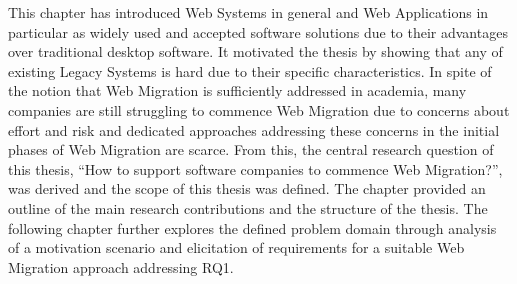 This chapter has introduced \glspl{Web System} in general and \glspl{Web Application} in particular as widely used and accepted software solutions due to their advantages over traditional desktop software.
It motivated the thesis by showing that any  of existing \glspl{Legacy System} is hard due to their specific characteristics.
In spite of the notion that \gls{Web Migration} is sufficiently addressed in academia, many companies are still struggling to commence \gls{Web Migration} due to concerns about effort and risk and dedicated approaches addressing these concerns in the initial phases of \gls{Web Migration} are scarce.
From this, the central research question of this thesis, ``How to support software companies to commence \gls{Web Migration}?'', was derived and the scope of this thesis was defined.
The chapter provided an outline of the main research contributions and the structure of the thesis.
The following chapter further explores the defined problem domain through analysis of a motivation scenario and elicitation of requirements for a suitable \gls{Web Migration} approach addressing RQ1.
